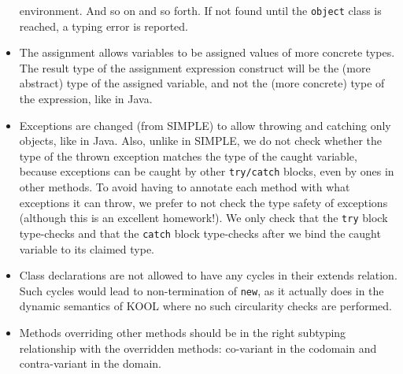 \begin{latexComment}
\begin{itemize}
environment.  And so on and so forth.  If not found until the
\texttt{object} class is reached, a typing error is reported.
\item The assignment allows variables to be assigned values of
more concrete types.  The result type of the assignment expression
construct will be the (more abstract) type of the assigned variable,
and not the (more concrete) type of the expression, like in Java.
\item Exceptions are changed (from SIMPLE) to allow throwing and
catching only objects, like in Java.  Also, unlike in SIMPLE, we do
not check whether the type of the thrown exception matches the type of
the caught variable, because exceptions can be caught by other
\texttt{try/catch} blocks, even by ones in other methods.  To avoid
having to annotate each method with what exceptions it can throw, we
prefer to not check the type safety of exceptions (although this is an
excellent homework!).  We only check that the \texttt{try} block
type-checks and that the \texttt{catch} block type-checks after we bind
the caught variable to its claimed type.
\item Class declarations are not allowed to have any cycles in their
extends relation.  Such cycles would lead to non-termination of
\texttt{new}, as it actually does in the dynamic semantics of KOOL
where no such circularity checks are performed.
\item Methods overriding other methods should be in the right subtyping
relationship with the overridden methods: co-variant in the codomain
and contra-variant in the domain.
\end{itemize}

\end{latexComment}

\vspace*{3ex}
